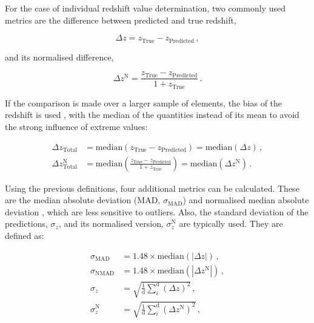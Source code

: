 \documentclass{aa}
\begin{document}
For the case of individual redshift value determination, two commonly used metrics are the difference between predicted and true redshift,

\begin{equation}
\Delta z = z_{\mathrm{True}} - z_{\mathrm{Predicted}}\,,
\end{equation}

\noindent and its normalised difference,

\begin{equation}\label{eq:delta_z_N}
\Delta z^{\mathrm{N}} = \frac{z_{\mathrm{True}} - z_{\mathrm{Predicted}}}{1 + z_{\mathrm{True}}}\,.
\end{equation}

If the comparison is made over a larger sample of elements, the bias of the redshift is used \citep{2013ApJ...775...93D}, with the median of the quantities instead of its mean to avoid the strong influence of extreme values:

\begin{align}
\Delta z_{\mathrm{Total}} &= \mathrm{median}\left(z_{\mathrm{True}} - z_{\mathrm{Predicted}}\right) = \mathrm{median}(\Delta z)\,,\\
\Delta z_{\mathrm{Total}}^{\mathrm{N}} &= \mathrm{median}\left(\frac{z_{\mathrm{True}} - z_{\mathrm{Predicted}}}{1 + z_{\mathrm{True}}}\right) = \mathrm{median}(\Delta z^{\mathrm{N}})\,.
\end{align}

Using the previous definitions, four additional metrics can be calculated. These are the median absolute deviation (MAD, $\sigma_{\mathrm{MAD}}$) and normalised median absolute deviation \citep[NMAD, $\sigma_{\mathrm{NMAD}}$;][]{hoaglin1983understanding, 2009ApJ...690.1236I}, which are less sensitive to outliers. Also, the standard deviation of the predictions, $\sigma_{z}$, and its normalised version, $\sigma_{z}^{\mathrm{N}}$ are typically used. They are defined as:

\begin{align}
\sigma_{\mathrm{MAD}} &= 1.48 \times \mathrm{median}\left(|\Delta z|\right)\,,\\
\sigma_{\mathrm{NMAD}} &= 1.48 \times \mathrm{median}\left(\left|\Delta z^{\mathrm{N}}\right|\right)\,,\\
\sigma_{z} &= \sqrt{\frac{1}{\mathrm{d}} \sum_{i}^{\mathrm{d}} \left(\Delta z\right)^{2}}\,,\\
\sigma_{z}^{\mathrm{N}} &= \sqrt{\frac{1}{\mathrm{d}} \sum_{i}^{\mathrm{d}} \left(\Delta z^{\mathrm{N}}\right)^{2}}\,,
\end{align}
\end{document}
